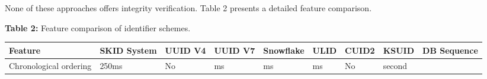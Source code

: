 \documentclass[fleqn,10pt,lineno]{wlpeerj}
\newcounter{none} %
\begin{document}
None of these approaches offers integrity verification. Table 2 presents
a detailed feature comparison.

\textbf{Table 2:} Feature comparison of identifier schemes.

{\def\LTcaptype{none} %
\begin{longtable}[]{@{}
  >{\raggedright\arraybackslash}p{}
  >{\raggedright\arraybackslash}p{}
  >{\raggedright\arraybackslash}p{}
  >{\raggedright\arraybackslash}p{}
  >{\raggedright\arraybackslash}p{}
  >{\raggedright\arraybackslash}p{}
  >{\raggedright\arraybackslash}p{}
  >{\raggedright\arraybackslash}p{}
  >{\raggedright\arraybackslash}p{}@{}}
\toprule\noalign{}
\begin{minipage}[b]{\linewidth}\raggedright
Feature
\end{minipage} & \begin{minipage}[b]{\linewidth}\raggedright
SKID System
\end{minipage} & \begin{minipage}[b]{\linewidth}\raggedright
UUID V4
\end{minipage} & \begin{minipage}[b]{\linewidth}\raggedright
UUID V7
\end{minipage} & \begin{minipage}[b]{\linewidth}\raggedright
Snowflake
\end{minipage} & \begin{minipage}[b]{\linewidth}\raggedright
ULID
\end{minipage} & \begin{minipage}[b]{\linewidth}\raggedright
CUID2
\end{minipage} & \begin{minipage}[b]{\linewidth}\raggedright
KSUID
\end{minipage} & \begin{minipage}[b]{\linewidth}\raggedright
DB Sequence
\end{minipage} \\
\midrule\noalign{}
\endhead
\bottomrule\noalign{}
\endlastfoot
Chronological ordering & 250ms & No & ms & ms & ms & No & second &

\end{longtable}}
\end{document}
